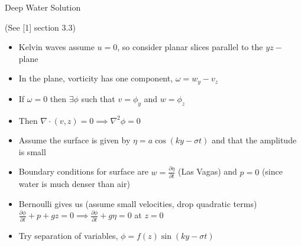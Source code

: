 \documentclass{beamer}
\begin{document}

\begin{frame}{Deep Water Solution}

(See [1] section 3.3)

\begin{itemize}

\item Kelvin waves assume $u=0$, so consider planar slices parallel to the $yz-$plane

\item In the plane, vorticity has one component, $\omega=w_y-v_z$

\item If $\omega=0$ then $\exists \phi$ such that $v=\phi_y$ and $w=\phi_z$

\item Then $\nabla \cdot (v,z) = 0 \implies \nabla^2 \phi=0$

\item Assume the surface is given by $\eta=a \cos (ky-\sigma t)$ and that the amplitude is small

\item Boundary conditions for surface are $w=\frac{\partial \eta}{\partial t}$ (Las Vagas) and $p=0$ (since water is much denser than air)

\item Bernoulli gives us (assume small velocities, drop quadratic terms) $\frac{\partial \phi}{\partial t}+p+gz=0 \implies \frac{\partial \phi}{\partial t}+g\eta=0$ at $z=0$

\item Try separation of variables, $\phi=f(z) \sin (ky-\sigma t)$



\end{itemize}

\end{frame}

\end{document}

